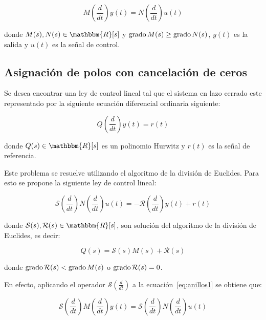         \begin{equation} \label{eq:anillos1}
            M \left( \frac{d}{dt} \right) y(t) = N \left( \frac{d}{dt} \right) u(t)
        \end{equation}

        donde $M(s), N(s) \in \mathbbm{R}[s]$ y $\operatorname{grado}{M(s)} \ge \operatorname{grado}{N(s)}$, $y(t)$ es la salida y $u(t)$ es la señal de control.

        \subsection{Asignación de polos con cancelación de ceros}

            Se desea encontrar una ley de control lineal tal que el sistema en lazo cerrado este representado por la siguiente ecuación diferencial ordinaria siguiente:

            \begin{equation}
                Q \left( \frac{d}{dt} \right) y(t) = r(t)
            \end{equation}

            donde $Q(s) \in \mathbbm{R}[s]$ es un polinomio Hurwitz y $r(t)$ es la señal de referencia.

            Este problema se resuelve utilizando el algoritmo de la división de Euclides. Para esto se propone la siguiente ley de control lineal:

            \begin{equation} \label{eq:anillos2}
                \mathcal{S} \left( \frac{d}{dt} \right) N \left( \frac{d}{dt} \right) u(t) = - \mathcal{R} \left( \frac{d}{dt} \right) y(t) + r(t)
            \end{equation}

            donde $\mathcal{S}(s), \mathcal{R}(s) \in \mathbbm{R}[s]$, son solución del algoritmo de la división de Euclides, es decir:

            \begin{equation} \label{eq:anillos3}
                Q(s) = \mathcal{S}(s) M(s) + \mathcal{R}(s)
            \end{equation}

            donde $\operatorname{grado}{\mathcal{R}(s)} < \operatorname{grado}{M(s)}$ o $\operatorname{grado}{\mathcal{R}(s)} = 0$.

            En efecto, aplicando el operador $\mathcal{S} \left( \frac{d}{dt} \right)$ a la ecuación~\ref{eq:anillos1} se obtiene que:

            \begin{equation*}
                \mathcal{S} \left( \frac{d}{dt} \right) M \left( \frac{d}{dt} \right) y(t) = \mathcal{S} \left( \frac{d}{dt} \right) N \left( \frac{d}{dt} \right) u(t)
            \end{equation*}

